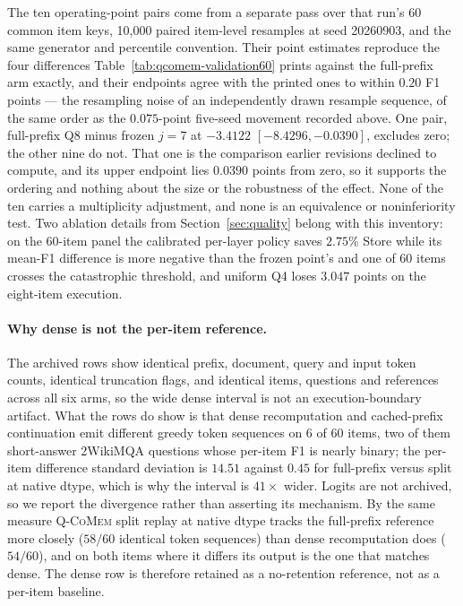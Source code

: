 \documentclass{article}
\newcommand{\qcomem}{\textsc{Q-CoMem}}
\begin{document}
The ten operating-point pairs come from a separate pass over that run's 60
common item keys, 10,000 paired item-level resamples at seed 20260903, and the
same generator and percentile convention.  Their point estimates reproduce the
four differences Table~\ref{tab:qcomem-validation60} prints against the
full-prefix arm exactly, and their endpoints agree with the printed ones to
within $0.20$ F1 points --- the resampling noise of an independently drawn
resample sequence, of the same order as the $0.075$-point five-seed movement
recorded above.  One pair, full-prefix Q8 minus frozen $j=7$ at $-3.4122$
$[-8.4296,-0.0390]$, excludes zero; the other nine do not.  That one is the
comparison earlier revisions declined to compute, and its upper endpoint lies
$0.0390$ points from zero, so it supports the ordering and nothing about the
size or the robustness of the effect.  None of the ten carries a multiplicity
adjustment, and none is an equivalence or noninferiority test.
Two ablation details from Section~\ref{sec:quality} belong with this inventory:
on the 60-item panel the calibrated per-layer policy saves $2.75\%$ Store while
its mean-F1 difference is more negative than the frozen point's and one of 60
items crosses the catastrophic threshold, and uniform Q4 loses $3.047$ points on
the eight-item execution.

\paragraph{Why dense is not the per-item reference.}
The archived rows show identical prefix, document, query and input token
counts, identical truncation flags, and identical items, questions and
references across all six arms, so the wide dense interval is not an
execution-boundary artifact.  What the rows do show is that dense
recomputation and cached-prefix continuation emit different greedy token
sequences on 6 of 60 items, two of them short-answer 2WikiMQA questions whose
per-item F1 is nearly binary; the per-item difference standard deviation is
$14.51$ against $0.45$ for full-prefix versus split at native dtype, which is why the
interval is $41\times$ wider.  Logits are not archived, so we report the
divergence rather than asserting its mechanism.  By the same measure
\qcomem{} split replay at native dtype tracks the full-prefix reference more closely ($58/60$ identical
token sequences) than dense recomputation does ($54/60$), and on both items
where it differs its output is the one that matches dense.  The dense row is
therefore retained as a no-retention reference, not as a per-item baseline.
\end{document}
